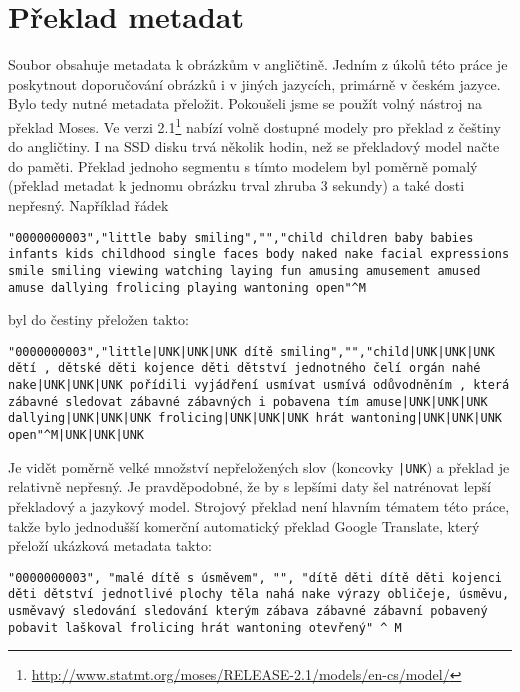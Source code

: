 \section{Překlad metadat}
Soubor obsahuje metadata k obrázkům v angličtině. Jedním z úkolů této práce je poskytnout doporučování obrázků i v jiných jazycích, primárně v českém jazyce. Bylo tedy nutné metadata přeložit. Pokoušeli jsme se použít volný nástroj na překlad Moses. Ve verzi 2.1\footnote{\url{http://www.statmt.org/moses/RELEASE-2.1/models/en-cs/model/}} nabízí volně dostupné modely pro překlad z češtiny do angličtiny. I na SSD disku trvá několik hodin, než se překladový model načte do paměti. Překlad jednoho segmentu s tímto modelem byl poměrně pomalý (překlad metadat k jednomu obrázku trval zhruba 3 sekundy) a také dosti nepřesný. Například řádek

\begin{lstlisting}
"0000000003","little baby smiling","","child children baby babies infants kids childhood single faces body naked nake facial expressions smile smiling viewing watching laying fun amusing amusement amused amuse dallying frolicing playing wantoning open"^M
\end{lstlisting}

byl do čestiny přeložen takto:

\begin{lstlisting}
"0000000003","little|UNK|UNK|UNK dítě smiling","","child|UNK|UNK|UNK dětí , dětské děti kojence děti dětství jednotného čelí orgán nahé nake|UNK|UNK|UNK pořídili vyjádření usmívat usmívá odůvodněním , která zábavné sledovat zábavné zábavných i pobavena tím amuse|UNK|UNK|UNK dallying|UNK|UNK|UNK frolicing|UNK|UNK|UNK hrát wantoning|UNK|UNK|UNK open"^M|UNK|UNK|UNK
\end{lstlisting}

Je vidět poměrně velké množství nepřeložených slov (koncovky \lstinline{|UNK}) a překlad je relativně nepřesný. Je pravděpodobné, že by s lepšími daty šel natrénovat lepší překladový a jazykový model. Strojový překlad není hlavním tématem této práce, takže bylo jednodušší komerční automatický překlad Google Translate, který přeloží ukázková metadata takto:

\begin{lstlisting}
"0000000003", "malé dítě s úsměvem", "", "dítě děti dítě děti kojenci děti dětství jednotlivé plochy těla nahá nake výrazy obličeje, úsměvu, usměvavý sledování sledování kterým zábava zábavné zábavní pobavený pobavit laškoval frolicing hrát wantoning otevřený" ^ M
\end{lstlisting}

